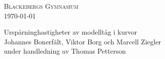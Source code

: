 \begin{titlepage}
    \noindent\textsc{Blackebergs Gymnasium}\\
    \today
    \vfill

    \begin{center}
    \LARGE{Urspårninghastigheter av modelltåg i kurvor} \\[0.75em]
    \large{Johannes Bonerfält, Viktor Borg och Marcell Ziegler} \\[0.5em]
    under handledning av Thomas Petterson
    \end{center}

    \vfill
\end{titlepage}